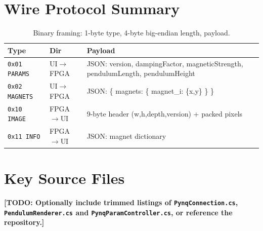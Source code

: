 \documentclass[11pt,a4paper]{article}
\newcommand{\todo}[1]{\textcolor{red!75!black}{\textbf{[TODO: #1]}}}
\begin{document}
\section{Wire Protocol Summary}
\begin{table}[h]
\centering
\small
\begin{tabular}{@{}llp{7.6cm}@{}}
\toprule
\textbf{Type} & \textbf{Dir} & \textbf{Payload} \\
\midrule
\texttt{0x01 PARAMS}  & UI$\to$FPGA & JSON: version, dampingFactor,
magneticStrength, pendulumLength, pendulumHeight \\
\texttt{0x02 MAGNETS} & UI$\to$FPGA & JSON: \{ magnets: \{ magnet\_i: \{x,y\} \} \} \\
\texttt{0x10 IMAGE}   & FPGA$\to$UI & 9-byte header (w,h,depth,version) +
packed pixels \\
\texttt{0x11 INFO}    & FPGA$\to$UI & JSON: magnet dictionary \\
\bottomrule
\end{tabular}
\caption{Binary framing: 1-byte type, 4-byte big-endian length, payload.}
\end{table}

\section{Key Source Files}
\todo{Optionally include trimmed listings of \texttt{PynqConnection.cs},
\texttt{PendulumRenderer.cs} and \texttt{PynqParamController.cs}, or reference
the repository.}
\end{document}
